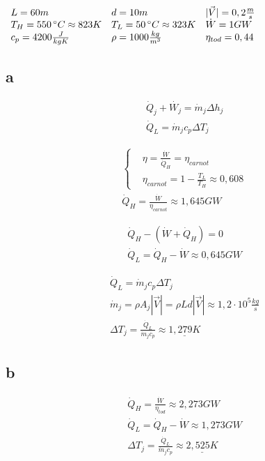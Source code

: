 \documentclass[12pt,a4paper,finnish]{article}
\begin{document}
\begin{math}
 \begin{array}{l l l}
  L = 60m & d = 10m & |\vec{V}| = 0,2\frac{m}{s} \\
  T_H = 550\,^{\circ}C \approx 823K & T_L = 50\,^{\circ}C \approx 323K & \dot{W} = 1 GW\\
  c_p = 4200 \frac{J}{kgK} & \rho = 1000 \frac{kg}{m^3} & \eta_{tod} = 0,44
 \end{array}
\end{math}

\subsection{a}

\begin{align}
 & \dot{Q}_j + \dot{W_j} = \dot{m}_j\Delta h_j\\
 & \dot{Q}_L = \dot{m}_jc_p\Delta T_j
\end{align}

\begin{align}
 &\left\{
 \begin{aligned}
  & \eta = \frac{\dot{W}}{\dot{Q}_H} = \eta_{carnot}\\
  & \eta_{carnot} = 1 - \frac{T_L}{T_H} \approx 0,608
 \end{aligned}\right.\\
 & \dot{Q}_H = \frac{\dot{W}}{\eta_{carnot}} \approx 1,645 GW
\end{align}

\begin{align}
 & \dot{Q}_H - (\dot{W} + \dot{Q}_H) = 0\\
 & \dot{Q}_L = \dot{Q}_H - \dot{W} \approx 0,645 GW
\end{align}

\begin{align}
 & \dot{Q}_L = \dot{m}_jc_p\Delta T_j\\
 & \dot{m}_j = \rho A_j |\vec{V}| = \rho Ld |\vec{V}| \approx 1,2\cdot 10^5 \frac{kg}{s}\\
 & \Delta T_j = \frac{\dot{Q}_L}{\dot{m}_jc_p} \approx \underline{1,279 K}
\end{align}

\subsection{b}

\begin{align}
 & \dot{Q}_H = \frac{\dot{W}}{\eta_{tod}} \approx 2,273 GW\\
 & \dot{Q}_L = \dot{Q}_H - \dot{W} \approx 1,273 GW\\
 & \Delta T_j = \frac{\dot{Q}_L}{\dot{m}_jc_p} \approx \underline{2,525 K}
\end{align}
\end{document}
